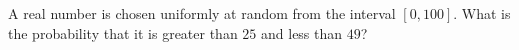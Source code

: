 A real number is chosen uniformly at random from the interval $[0,100]$. What is the probability that it is greater than $25$ and less than $49$?
